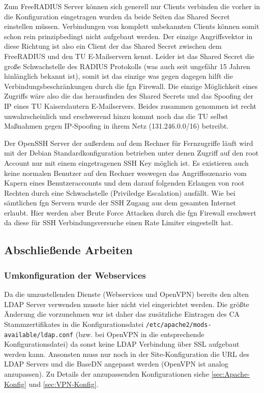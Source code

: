\documentclass[11pt,a4paper,titlepage=firstiscover]{scrartcl} %
\begin{document}
Zum FreeRADIUS Server können sich generell nur Clients verbinden die vorher in die Konfiguration eingetragen wurden da beide Seiten das Shared Secret einstellen müssen. Verbindungen von komplett unbekannten Clients können somit schon rein prinzipbedingt nicht aufgebaut werden. Der einzige Angriffsvektor in diese Richtung ist also ein Client der das Shared Secret zwischen dem FreeRADIUS und den TU E-Mailservern kennt. Leider ist das Shared Secret die große Schwachstelle des RADIUS Protokolls (was auch seit ungefähr 15 Jahren hinlänglich bekannt ist), somit ist das einzige was gegen dagegen hilft die Verbindungsbeschränkungen durch die fgn Firewall. Die einzige Möglichkeit eines Zugriffs wäre also die das herausfinden des Shared Secrets und das Spoofing der IP eines TU Kaiserslautern E-Mailservers. Beides zusammen genommen ist recht unwahrscheinlich und erschwerend hinzu kommt noch das die TU selbst Maßnahmen gegen IP-Spoofing in ihrem Netz (131.246.0.0/16) betreibt.

Der OpenSSH Server der außerdem auf dem Rechner für Fernzugriffe läuft wird mit der Debian Standardkonfiguration betrieben unter denen Zugriff auf den root Account nur mit einem eingetragenen SSH Key möglich ist. Es existieren auch keine normalen Benutzer auf den Rechner weswegen das Angriffsszenario vom Kapern eines Benutzeraccounts und dem darauf folgenden Erlangen von root Rechten durch eine Schwachstelle (Priviledge Escalation) ausfällt. Wie bei sämtlichen fgn Servern wurde der SSH Zugang aus dem gesamten Internet erlaubt. Hier werden aber Brute Force Attacken durch die fgn Firewall erschwert da diese für SSH Verbindungsversuche einen Rate Limiter eingestellt hat.

\subsection{Abschließende Arbeiten}
\subsubsection{Umkonfiguration der Webservices}
Da die umzustellenden Dienste (Webservices und OpenVPN) bereits den alten LDAP Server verwenden musste hier nicht viel eingerichtet werden. Die größte Änderung die vorzunehmen war ist daher das zusätzliche Eintragen des CA Stammzertifikates in die Konfigurationsdatei \texttt{/etc/apache2/mods-available/ldap.conf} (bzw. bei OpenVPN in die entsprechende Konfigurationsdatei) da sonst keine LDAP Verbindung über SSL aufgebaut werden kann. Ansonsten muss nur noch in der Site-Konfiguration die URL des LDAP Servers und die BaseDN angepasst werden (OpenVPN ist analog anzupassen). Zu Details der anzupassenden Konfigurationen siehe \autoref{sec:Apache-Konfig} und \autoref{sec:VPN-Konfig}.
\end{document}
